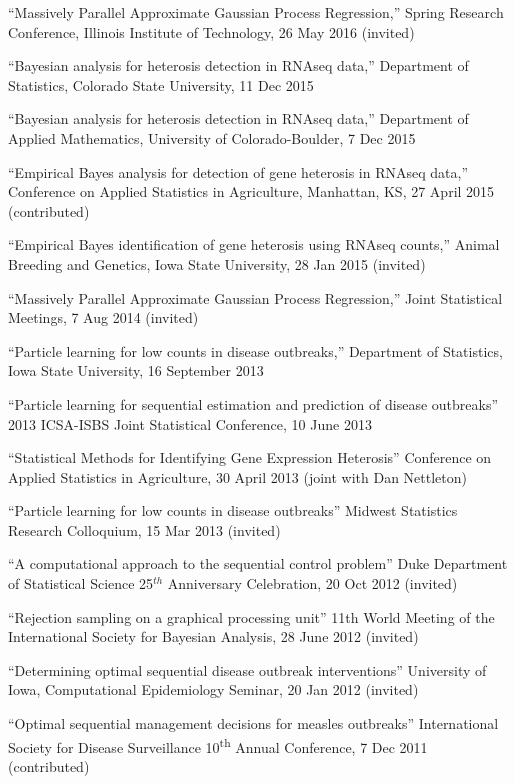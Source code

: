 \documentclass[overlapped,line]{res}
\begin{document}
\begin{resume}
{\small

``Massively Parallel Approximate Gaussian Process Regression,'' Spring Research Conference, Illinois Institute of Technology, 26 May 2016 (invited)

``Bayesian analysis for heterosis detection in RNAseq data,'' Department of Statistics, Colorado State University, 11 Dec 2015

``Bayesian analysis for heterosis detection in RNAseq data,'' Department of Applied Mathematics, University of Colorado-Boulder, 7 Dec 2015

``Empirical Bayes analysis for detection of gene heterosis in RNAseq data,'' Conference on Applied Statistics in Agriculture, Manhattan, KS, 27 April 2015 (contributed)

``Empirical Bayes identification of gene heterosis using RNAseq counts,'' Animal Breeding and Genetics, Iowa State University, 28 Jan 2015 (invited)



``Massively Parallel Approximate Gaussian Process Regression,'' Joint Statistical Meetings, 7 Aug 2014 (invited)

``Particle learning for low counts in disease outbreaks,'' Department of Statistics, Iowa State University, 16 September 2013

``Particle learning for sequential estimation and prediction of disease outbreaks''  2013 ICSA-ISBS Joint Statistical Conference, 10 June 2013

``Statistical Methods for Identifying Gene Expression Heterosis'' Conference on Applied Statistics in Agriculture, 30 April 2013 (joint with Dan Nettleton)



``Particle learning for low counts in disease outbreaks'' Midwest Statistics Research Colloquium, 15 Mar 2013 (invited)

``A computational approach to the sequential control problem'' Duke Department of Statistical Science 25$^{th}$ Anniversary Celebration, 20 Oct 2012 (invited)

``Rejection sampling on a graphical processing unit'' 11th World Meeting of the International Society for Bayesian Analysis, 28 June 2012 (invited)

``Determining optimal sequential disease outbreak interventions'' University of Iowa, Computational Epidemiology Seminar, 20 Jan 2012 (invited)

``Optimal sequential management decisions for measles outbreaks'' International Society for Disease Surveillance 10\textsuperscript{th} Annual Conference, 7 Dec 2011 (contributed)




}
\end{resume}
\end{document}
